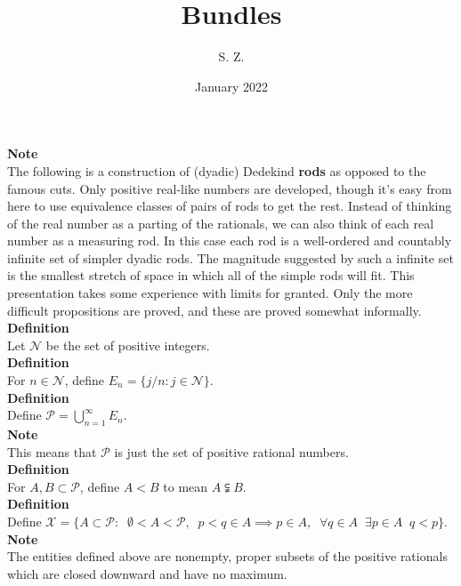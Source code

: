 \documentclass{article}
\title{Bundles}
\author{S. Z. }
\date{January 2022}
\newcommand{\targetset}{ \mathscr{X}}
\newcommand{\sourceset}{ \mathscr{P}}
\newcommand{\nondisjoints}{E}
\newcommand{\naturals}{ \mathscr{N}}
\newcommand{\elt}{q}
\newcommand{\altelt}{p}
\begin{document}
\maketitle

\textbf{Note}\\
The following is a construction of (dyadic) Dedekind \textbf{rods} as opposed to the famous cuts. Only positive real-like numbers are developed, though it's easy from here to use equivalence classes of pairs of rods to get the rest.  Instead of thinking of the real number as a parting of the rationals, we can also think of each real number as a measuring rod. In this case each rod is a well-ordered and countably infinite set of simpler dyadic rods. The magnitude suggested by such a infinite set is the smallest stretch of space in which all of the simple rods will fit. This presentation takes some experience with limits for granted. Only the more difficult propositions are proved, and these are proved somewhat informally.\\


\textbf{Definition}\\
Let $\naturals $ be the set of positive integers.\\

\textbf{Definition}\\
For $n \in \naturals$, define  $\nondisjoints_n  = \{j/n : j \in \naturals \}$. \\


\textbf{Definition}\\
Define $\sourceset = \bigcup_{n = 1}^\infty \nondisjoints_n$.\\

\textbf{Note}\\
This means that $\sourceset$ is just the set of positive rational numbers.\\

\textbf{Definition}\\
For $A,B \subset \sourceset$, define $A < B$ to mean $A \subsetneqq B $.\\

\textbf{Definition}\\
Define $\targetset = \{A \subset \sourceset : \;\; \emptyset < A < \sourceset,\;\; \altelt < \elt \in A \implies \altelt \in A,\;\; \forall \elt \in A \;\; \exists \altelt  \in A \;\; \elt < \altelt \}$.\\

\textbf{Note}\\
The entities defined above are nonempty, proper subsets of the positive rationals which are closed downward and have no maximum.\\
\end{document}
